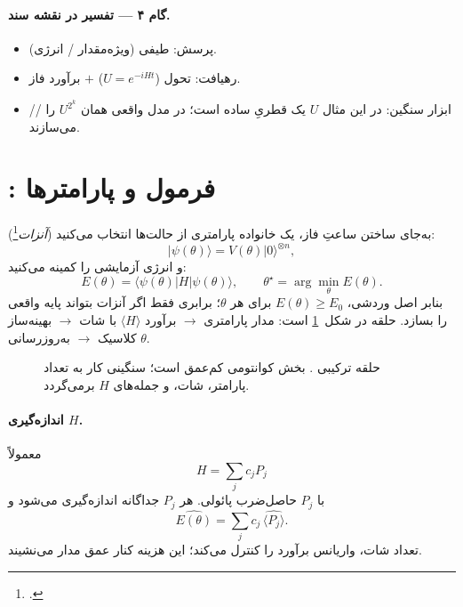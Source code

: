 \paragraph{گام ۴ --- تفسیر در نقشه سند.}
\begin{itemize}
	\item پرسش: طیفی (ویژه‌مقدار / انرژی).
	\item رهیافت: تحول ($U=e^{-iHt}$) $+$ برآورد فاز.
	\item ابزار سنگین: در این مثال $U$ یک قطریِ ساده است؛ در مدل واقعی همان $U^{2^{k}}$ را // می‌سازند.
\end{itemize}

\section{: فرمول و پارامترها}
\label{sec:vqe}

به‌جای ساختن ساعتِ فاز، یک خانواده پارامتری از حالت‌ها انتخاب می‌کنید (\emph{آنزات}\footnote{.}):
\begin{equation}
	\lvert\psi(\theta)\rangle = V(\theta)\lvert0\rangle^{\otimes n},
\end{equation}
و انرژی آزمایشی را کمینه می‌کنید:
\begin{equation}
	\label{eq:vqe}
	E(\theta)=\langle\psi(\theta)\rvert H\lvert\psi(\theta)\rangle,
	\qquad
	\theta^\star=\arg\min_\theta E(\theta).
\end{equation}
بنابر اصل وردشی، $E(\theta)\ge E_0$ برای هر $\theta$؛ برابری فقط اگر آنزات بتواند پایه واقعی را بسازد. حلقه در شکل~\ref{fig:vqe-loop} است: مدار پارامتری $\to$ برآورد $\langle H\rangle$ با شات $\to$ بهینه‌ساز کلاسیک $\to$ به‌روزرسانی $\theta$.

\begin{figure}[htbp]
	\centering
	\begin{latin}
		\resizebox{0.92\textwidth}{!}{%
		}
	\end{latin}
	\caption{حلقه ترکیبی . بخش کوانتومی کم‌عمق است؛ سنگینی کار به تعداد پارامتر، شات، و جمله‌های $H$ برمی‌گردد.}
	\label{fig:vqe-loop}
\end{figure}

\paragraph{اندازه‌گیری $H$.}
معمولاً
\begin{equation}
	H=\sum_j c_j P_j
\end{equation}
با $P_j$ حاصل‌ضرب پائولی. هر $P_j$ جداگانه اندازه‌گیری می‌شود و
\begin{equation}
	\widehat{E(\theta)}=\sum_j c_j\,\widehat{\langle P_j\rangle}.
\end{equation}
تعداد شات، واریانس برآورد را کنترل می‌کند؛ این هزینه کنار عمق مدار می‌نشیند.

